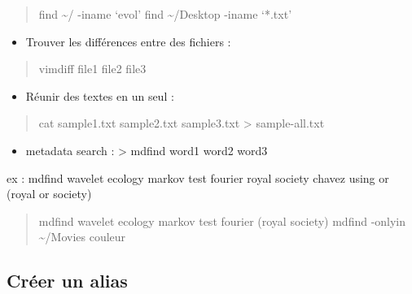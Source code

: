 \begin{quote}
find \textasciitilde{}/ -iname `evol' find \textasciitilde{}/Desktop
-iname `*.txt'
\end{quote}

\begin{itemize}
\tightlist
\item
  Trouver les différences entre des fichiers :
\end{itemize}

\begin{quote}
vimdiff file1 file2 file3
\end{quote}

\begin{itemize}
\tightlist
\item
  Réunir des textes en un seul :
\end{itemize}

\begin{quote}
cat sample1.txt sample2.txt sample3.txt \textgreater{} sample-all.txt
\end{quote}

\begin{itemize}
\tightlist
\item
  metadata search : \textgreater{} mdfind word1 word2 word3
\end{itemize}

ex : mdfind wavelet ecology markov test fourier royal society chavez
using or (royal or society)

\begin{quote}
mdfind wavelet ecology markov test fourier (royal \textbar{} society)
mdfind -onlyin \textasciitilde{}/Movies couleur
\end{quote}

\subsection{Créer un alias}\label{cruxe9er-un-alias}

